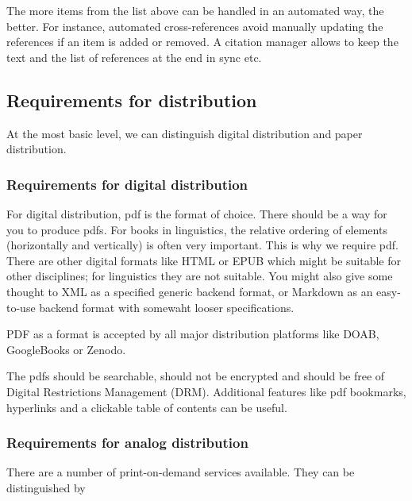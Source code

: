\documentclass[guidelines,nonflat,modfonts] {langsci/langscibook}
\begin{document}
The more items from the list above can be handled in an automated way, the better. For instance, automated cross-references avoid manually updating the references if an item is added or removed. A citation manager allows to keep the text and the list of references at the end in sync etc. 
                        
                        
                        
\subsection{Requirements for distribution}
At the most basic level, we can distinguish digital distribution and paper distribution. 

\subsubsection{Requirements for digital distribution}
For digital distribution, pdf is the format of choice. There should be a way for you to produce pdfs.  For books in linguistics, the relative ordering of elements (horizontally and vertically) is often very important. This is why we require pdf. There are other digital formats like HTML or EPUB which might be suitable for other disciplines; for linguistics they are not suitable. You might also give some thought to XML as a specified generic backend format, or Markdown as an easy-to-use backend format with somewaht looser specifications. 

PDF as a format is accepted by all major distribution platforms like DOAB, GoogleBooks or Zenodo. 
 

The pdfs should be searchable, should not be encrypted and should be free of Digital Restrictions Management (DRM). Additional features like pdf bookmarks, hyperlinks and a clickable table of contents can be useful. 

\subsubsection{Requirements for analog distribution}
There are a number of print-on-demand services available. They can be distinguished by 
\end{document}
